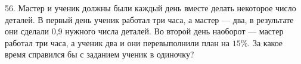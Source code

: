 56. Мастер и ученик должны были каждый день вместе делать некоторое число деталей. В первый день ученик работал три часа, а мастер --- два, в результате они сделали 0,9 нужного числа деталей. Во второй день наоборот --- мастер работал три часа, а ученик два и они перевыполнили план на $15\%.$ За какое время справился бы с заданием ученик в одиночку?\\
